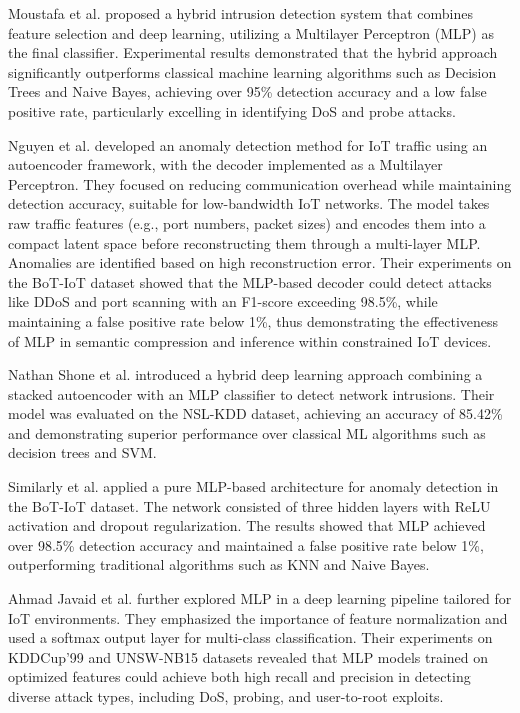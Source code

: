 \begin{ZhChapter}
    Moustafa et al. \cite{moustafa2019new} proposed a hybrid intrusion detection system that combines feature selection and deep learning, utilizing a Multilayer Perceptron (MLP) as the final classifier. Experimental results demonstrated that the hybrid approach significantly outperforms classical machine learning algorithms such as Decision Trees and Naive Bayes, achieving over 95\% detection accuracy and a low false positive rate, particularly excelling in identifying DoS and probe attacks.


    Nguyen et al. \cite{nguyen2020autoencoder} developed an anomaly detection method for IoT traffic using an autoencoder framework, with the decoder implemented as a Multilayer Perceptron. They focused on reducing communication overhead while maintaining detection accuracy, suitable for low-bandwidth IoT networks. The model takes raw traffic features (e.g., port numbers, packet sizes) and encodes them into a compact latent space before reconstructing them through a multi-layer MLP. Anomalies are identified based on high reconstruction error. Their experiments on the BoT-IoT dataset showed that the MLP-based decoder could detect attacks like DDoS and port scanning with an F1-score exceeding 98.5\%, while maintaining a false positive rate below 1\%, thus demonstrating the effectiveness of MLP in semantic compression and inference within constrained IoT devices.


    Nathan Shone et al. \cite{shone2018deep} introduced a hybrid deep learning approach combining a stacked autoencoder with an MLP classifier to detect network intrusions. Their model was evaluated on the NSL-KDD dataset, achieving an accuracy of 85.42\% and demonstrating superior performance over classical ML algorithms such as decision trees and SVM.

    Similarly et al. \cite{rahman2020deep} applied a pure MLP-based architecture for anomaly detection in the BoT-IoT dataset. The network consisted of three hidden layers with ReLU activation and dropout regularization. The results showed that MLP achieved over 98.5\% detection accuracy and maintained a false positive rate below 1\%, outperforming traditional algorithms such as KNN and Naive Bayes.

    Ahmad Javaid et al. \cite{javaid2016deep} further explored MLP in a deep learning pipeline tailored for IoT environments. They emphasized the importance of feature normalization and used a softmax output layer for multi-class classification. Their experiments on KDDCup'99 and UNSW-NB15 datasets revealed that MLP models trained on optimized features could achieve both high recall and precision in detecting diverse attack types, including DoS, probing, and user-to-root exploits.






\end{ZhChapter}
